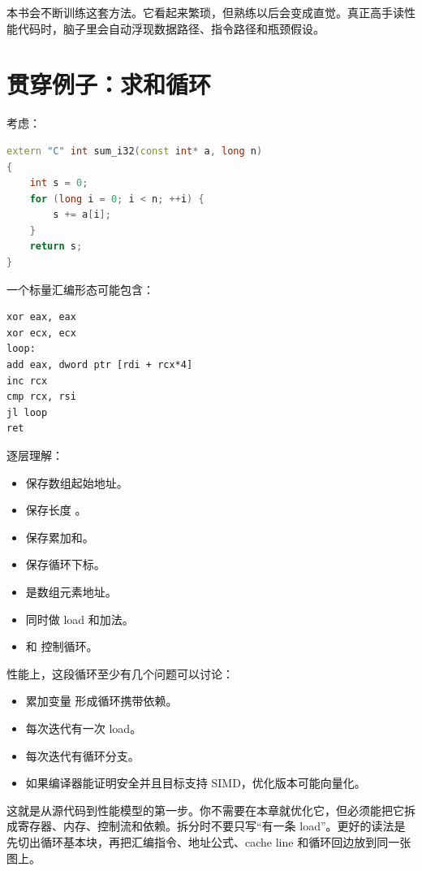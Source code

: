 本书会不断训练这套方法。它看起来繁琐，但熟练以后会变成直觉。真正高手读性能代码时，脑子里会自动浮现数据路径、指令路径和瓶颈假设。

\section{贯穿例子：求和循环}

考虑：

\begin{lstlisting}[language=C++]
extern "C" int sum_i32(const int* a, long n)
{
    int s = 0;
    for (long i = 0; i < n; ++i) {
        s += a[i];
    }
    return s;
}
\end{lstlisting}

一个标量汇编形态可能包含：

\begin{lstlisting}
xor eax, eax
xor ecx, ecx
loop:
add eax, dword ptr [rdi + rcx*4]
inc rcx
cmp rcx, rsi
jl loop
ret
\end{lstlisting}

逐层理解：

\begin{itemize}
  \item {} 保存数组起始地址。
  \item {} 保存长度 。
  \item {} 保存累加和。
  \item {} 保存循环下标。
  \item {} 是数组元素地址。
  \item {} 同时做 load 和加法。
  \item {} 和  控制循环。
\end{itemize}

性能上，这段循环至少有几个问题可以讨论：

\begin{itemize}
  \item 累加变量  形成循环携带依赖。
  \item 每次迭代有一次 load。
  \item 每次迭代有循环分支。
  \item 如果编译器能证明安全并且目标支持 SIMD，优化版本可能向量化。
\end{itemize}

这就是从源代码到性能模型的第一步。你不需要在本章就优化它，但必须能把它拆成寄存器、内存、控制流和依赖。拆分时不要只写“有一条 load”。更好的读法是先切出循环基本块，再把汇编指令、地址公式、cache line 和循环回边放到同一张图上。

